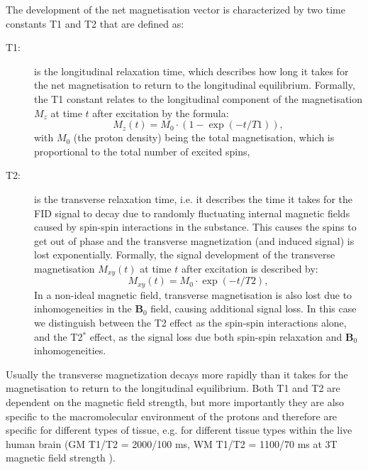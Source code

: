 The development of the net magnetisation vector is characterized by two time constants T1 and T2 that are defined as:  
\begin{description}
	\item[T1:] is the longitudinal relaxation time, which describes how long it takes for the net magnetisation to return to the longitudinal equilibrium. Formally, the T1 constant relates to the longitudinal component of the magnetisation $M_z$ at time $t$ after excitation by the formula:
	\begin{equation}
		M_z(t) = M_0 \cdot (1-\exp(-t/T1)),
	\end{equation} 
	with $M_0$ (the proton density) being the total magnetisation, which is proportional to the total number of excited spins, 
	\item[T2:] is the transverse relaxation time, i.e. it describes the time it takes for the FID signal to decay due to randomly fluctuating internal magnetic fields caused by spin-spin interactions in the substance. This causes the spins to get out of phase and the transverse magnetization (and induced signal) is lost exponentially. Formally, the signal development of the transverse magnetisation $M_{xy}(t)$ at time $t$ after excitation is described by:
	\begin{equation}
		M_{xy}(t) = M_0 \cdot \exp(-t/T2),
	\end{equation} 	
	In a non-ideal magnetic field, transverse magnetisation is also lost due to inhomogeneities in the $\mathbf{B}_0$ field, causing additional signal loss. In this case we distinguish between the T2 effect as the spin-spin interactions alone, and the T2$^*$ effect, as the signal loss due both spin-spin relaxation and $\mathbf{B}_0$ inhomogeneities.
\end{description}

Usually the transverse magnetization decays more rapidly than it takes for the magnetisation to return to the longitudinal equilibrium. Both T1 and T2 are dependent on the magnetic field strength, but more importantly they are also specific to the macromolecular environment of the protons and therefore are specific for different types of tissue, e.g. for different tissue types within the live human brain (\gls{GM} T1/T2 = 2000/100 ms, \gls{WM} T1/T2 = 1100/70 ms at 3T magnetic field strength \citep{Stanisz:2005}).
